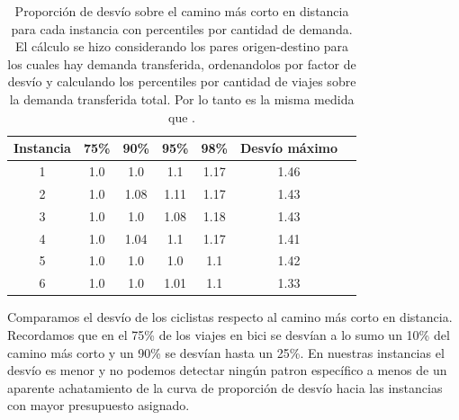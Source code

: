 \begin{table}[h!]
  \centering
  \begin{tabular}{ccccccc}
    \toprule
      Instancia & 75\% & 90\% & 95\% & 98\% & Desvío máximo \\
    \midrule
      1 & 1.0 & 1.0 & 1.1 & 1.17 & 1.46 \\
      2 & 1.0 & 1.08 & 1.11 & 1.17 & 1.43 \\
      3 & 1.0 & 1.0 & 1.08 & 1.18 & 1.43 \\
      4 & 1.0 & 1.04 & 1.1 & 1.17 & 1.41 \\
      5 & 1.0 & 1.0 & 1.0 & 1.1 & 1.42 \\
      6 & 1.0 & 1.0 & 1.01 & 1.1 & 1.33 \\
    \bottomrule
  \end{tabular}
  \caption{Proporción de desvío sobre el camino más corto en distancia para cada instancia con percentiles por cantidad de demanda. El cálculo se hizo considerando los pares origen-destino para los cuales hay demanda transferida, ordenandolos por factor de desvío y calculando los percentiles por cantidad de viajes sobre la demanda transferida total. Por lo tanto es la misma medida que \cite{winters2010}.}
  \label{table:montevideoshortestpathdeviation}
\end{table}

Comparamos el desvío de los ciclistas respecto al camino más corto en distancia. Recordamos que en \cite{winters2010} el 75\% de los viajes en bici se desvían a lo sumo un 10\% del camino más corto y un 90\% se desvían hasta un 25\%. En nuestras instancias el desvío es menor y no podemos detectar ningún patron específico a menos de un aparente achatamiento de la curva de proporción de desvío hacia las instancias con mayor presupuesto asignado.


